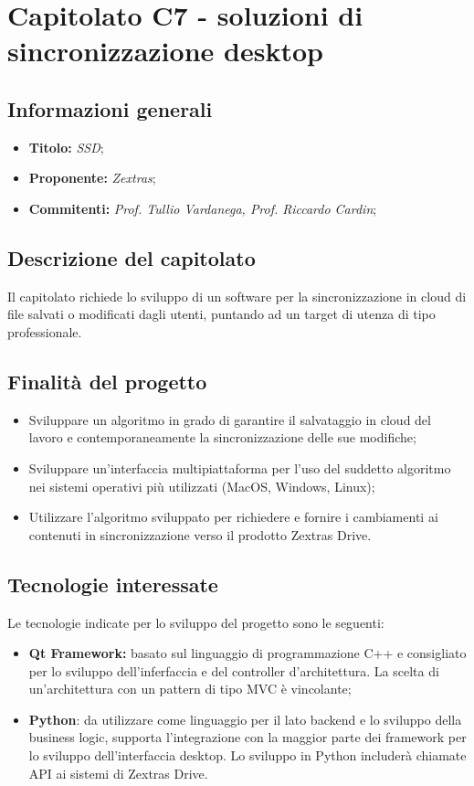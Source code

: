 \section{Capitolato C7 - soluzioni di sincronizzazione desktop}
\subsection{Informazioni generali}
\begin{itemize}
    \item \textbf{Titolo:} \textit{SSD};
    \item \textbf{Proponente:} \textit{Zextras};
    \item \textbf{Commitenti:} \textit{Prof. Tullio Vardanega, Prof. Riccardo Cardin};
\end{itemize}
\subsection{Descrizione del capitolato}
Il capitolato richiede lo sviluppo di un software per la sincronizzazione in cloud di file salvati o modificati dagli utenti, puntando ad un target di utenza di tipo professionale.
\subsection{Finalità del progetto}
\begin{itemize}
    \item Sviluppare un algoritmo in grado di garantire
    il salvataggio in cloud del lavoro e contemporaneamente la sincronizzazione
    delle sue modifiche;
    \item Sviluppare un’interfaccia multipiattaforma per l’uso
    del suddetto algoritmo nei sistemi operativi più utilizzati (MacOS,
    Windows, Linux);
    \item  Utilizzare l’algoritmo sviluppato per richiedere e fornire i
    cambiamenti ai contenuti in sincronizzazione verso il prodotto Zextras
    Drive.
\end{itemize}
\subsection{Tecnologie interessate}
Le tecnologie indicate per lo sviluppo del progetto sono le seguenti:
    \begin{itemize}
        \item \textbf{Qt Framework:} basato sul linguaggio di programmazione C++ e consigliato per lo sviluppo dell'inferfaccia e del controller d'architettura. La scelta di un'architettura con un pattern di tipo MVC è vincolante;
        \item \textbf{Python}: da utilizzare come linguaggio per il lato backend e lo sviluppo della business logic, supporta l'integrazione con la maggior parte dei framework per lo sviluppo dell'interfaccia desktop. Lo sviluppo in Python includerà chiamate API ai sistemi di Zextras Drive.
    \end{itemize}

